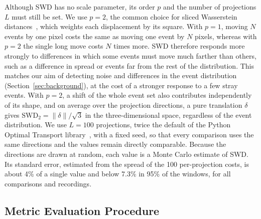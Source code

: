 Although SWD has no scale parameter, its order $p$ and the number of projections $L$ must still be set. We use $p = 2$, the common choice for sliced Wasserstein distances~\cite{bonneel2015sliced}, which weights each displacement by its square. With $p = 1$, moving $N$ events by one pixel costs the same as moving one event by $N$ pixels, whereas with $p = 2$ the single long move costs $N$ times more. SWD therefore responds more strongly to differences in which some events must move much farther than others, such as a difference in spread or events far from the rest of the distribution. This matches our aim of detecting noise and differences in the event distribution (Section~\ref{sec:background}), at the cost of a stronger response to a few stray events. With $p = 2$, a shift of the whole event set also contributes independently of its shape, and on average over the projection directions, a pure translation $\delta$ gives $\mathrm{SWD}_2 = \|\delta\|/\sqrt{3}$ in the three-dimensional space, regardless of the event distribution. We use $L = 100$ projections, twice the default of the Python Optimal Transport library~\cite{flamary2021pot}, with a fixed seed, so that every comparison uses the same directions and the values remain directly comparable. Because the directions are drawn at random, each value is a Monte Carlo estimate of SWD. Its standard error, estimated from the spread of the 100 per-projection costs, is about 4\% of a single value and below 7.3\% in 95\% of the windows, for all comparisons and recordings.

\subsection{Metric Evaluation Procedure}
\label{sec:procedure}

